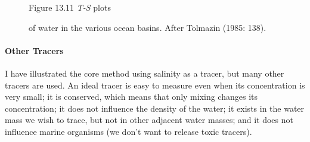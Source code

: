 \begin{figure}[t!]
\centering
{}
\footnotesize
Figure 13.11 \textit{T-S} plots \rule{0pt}{3ex}of water in the various
ocean basins. After Tolmazin (1985: 138).

\label{fig:TSplots}
\vspace{-3ex}
\end{figure}

\paragraph{Other Tracers}
I have illustrated the core
method using salinity as a tracer, but many other tracers are used. An
ideal tracer is easy to measure even when its concentration is very
small; it is conserved, which means that only mixing changes its concentration; it does not influence the
density of the water; it exists in the water mass we wish to trace,
but not in other adjacent water masses; and it does not influence
marine organisms (we don't want to release toxic tracers).

